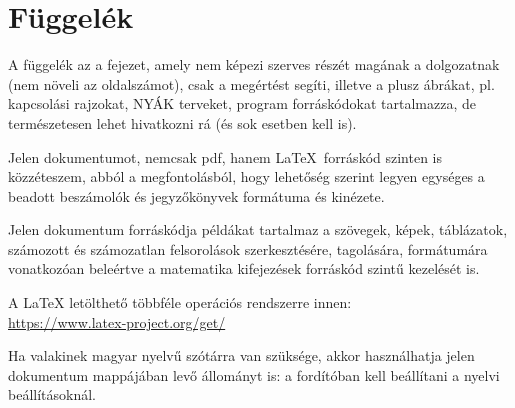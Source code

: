\chapter*{Függelék}

A függelék az a fejezet, amely nem képezi szerves részét magának a dolgozatnak (nem növeli az oldalszámot), csak a megértést segíti, illetve a plusz ábrákat, pl. kapcsolási rajzokat, NYÁK terveket, program forráskódokat tartalmazza, de természetesen lehet hivatkozni rá (és sok esetben kell is). \label{fugg}

Jelen dokumentumot, nemcsak pdf, hanem \LaTeX \  forráskód szinten is közzéteszem, abból a megfontolásból, hogy lehetőség szerint legyen egységes a beadott beszámolók és jegyzőkönyvek formátuma és kinézete.

Jelen dokumentum forráskódja példákat tartalmaz a szövegek, képek, táblázatok, számozott és számozatlan felsorolások szerkesztésére, tagolására, formátumára vonatkozóan beleértve a matematika kifejezések forráskód szintű kezelését is.

A LaTeX letölthető többféle operációs rendszerre innen: 
\\
\url{https://www.latex-project.org/get/}

Ha valakinek magyar nyelvű szótárra van szüksége, akkor használhatja jelen dokumentum mappájában levő állományt is: a fordítóban kell beállítani a nyelvi beállításoknál.
